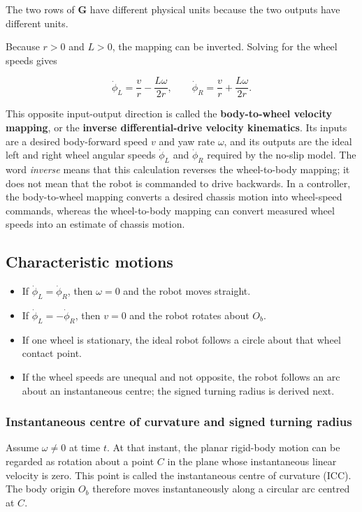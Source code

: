 \documentclass[
  australian,
  12pt,
  letterpaper,
  DIV=11,
  numbers=noendperiod,
  twoside]{scrreprt}
\providecommand{\tightlist}{%
  \setlength{\itemsep}{0pt}\setlength{\parskip}{0pt}}
\begin{document}
The two rows of \(\mathbf G\) have different physical units because the
two outputs have different units.

Because \(r>0\) and \(L>0\), the mapping can be inverted. Solving for
the wheel speeds gives

\[
\boxed{
\dot\phi_L=\frac{v}{r}-\frac{L\omega}{2r},
\qquad
\dot\phi_R=\frac{v}{r}+\frac{L\omega}{2r}
}.
\]

This opposite input-output direction is called the \textbf{body-to-wheel
velocity mapping}, or the \textbf{inverse differential-drive velocity
kinematics}. Its inputs are a desired body-forward speed \(v\) and yaw
rate \(\omega\), and its outputs are the ideal left and right wheel
angular speeds \(\dot\phi_L\) and \(\dot\phi_R\) required by the no-slip
model. The word \emph{inverse} means that this calculation reverses the
wheel-to-body mapping; it does not mean that the robot is commanded to
drive backwards. In a controller, the body-to-wheel mapping converts a
desired chassis motion into wheel-speed commands, whereas the
wheel-to-body mapping can convert measured wheel speeds into an estimate
of chassis motion.

\subsection{Characteristic motions}\label{characteristic-motions}

\begin{itemize}
\tightlist
\item
  If \(\dot\phi_L=\dot\phi_R\), then \(\omega=0\) and the robot moves
  straight.
\item
  If \(\dot\phi_L=-\dot\phi_R\), then \(v=0\) and the robot rotates
  about \(O_b\).
\item
  If one wheel is stationary, the ideal robot follows a circle about
  that wheel contact point.
\item
  If the wheel speeds are unequal and not opposite, the robot follows an
  arc about an instantaneous centre; the signed turning radius is
  derived next.
\end{itemize}

\subsubsection{Instantaneous centre of curvature and signed turning
radius}\label{instantaneous-centre-of-curvature-and-signed-turning-radius}

Assume \(\omega\neq0\) at time \(t\). At that instant, the planar
rigid-body motion can be regarded as rotation about a point \(C\) in the
plane whose instantaneous linear velocity is zero. This point is called
the instantaneous centre of curvature (ICC). The body origin \(O_b\)
therefore moves instantaneously along a circular arc centred at \(C\).
\end{document}
